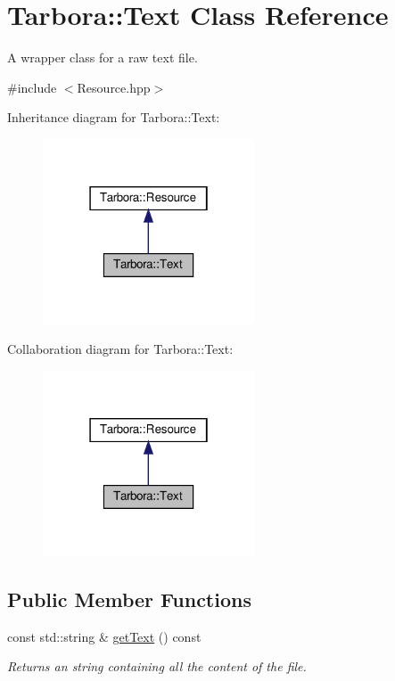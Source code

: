 \hypertarget{classTarbora_1_1Text}{}\section{Tarbora\+:\+:Text Class Reference}
\label{classTarbora_1_1Text}


A wrapper class for a raw text file.  




{\ttfamily \#include $<$Resource.\+hpp$>$}



Inheritance diagram for Tarbora\+:\+:Text\+:\nopagebreak
\begin{figure}[H]
\begin{center}
\leavevmode
\includegraphics[width=178pt]{classTarbora_1_1Text__inherit__graph}
\end{center}
\end{figure}


Collaboration diagram for Tarbora\+:\+:Text\+:\nopagebreak
\begin{figure}[H]
\begin{center}
\leavevmode
\includegraphics[width=178pt]{classTarbora_1_1Text__coll__graph}
\end{center}
\end{figure}
\subsection*{Public Member Functions}
\begin{DoxyCompactItemize}
\item 
\mbox{\label{classTarbora_1_1Text_a5122bf32fccb1c09dab58b3b6e102adf}} 
const std\+::string \& \hyperlink{classTarbora_1_1Text_a5122bf32fccb1c09dab58b3b6e102adf}{get\+Text} () const
\begin{DoxyCompactList}\small\item\em Returns an string containing all the content of the file. \end{DoxyCompactList}\end{DoxyCompactItemize}
